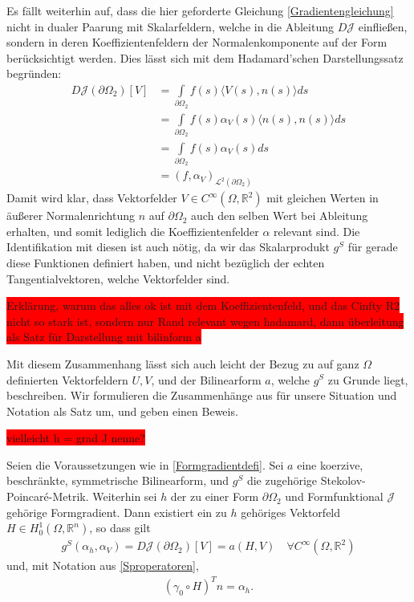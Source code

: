 Es fällt weiterhin auf, dass die hier geforderte Gleichung \ref{Gradientengleichung} nicht in dualer Paarung mit Skalarfeldern, welche in die Ableitung $D\mathcal{J}$ einfließen, sondern in deren Koeffizientenfeldern der Normalenkomponente auf der Form berücksichtigt werden. Dies lässt sich mit dem Hadamard'schen Darstellungssatz begründen:
\begin{align*}
	D\mathcal{J}(\partial\Omega_2)[V] &= \underset{\partial\Omega_2}{\int}f(s)\langle V(s),n(s)\rangle ds \\
	&=\underset{\partial\Omega_2}{\int}f(s) \alpha_V(s)\langle n(s),n(s)\rangle ds \\
	&=\underset{\partial\Omega_2}{\int}f(s) \alpha_V(s) ds \\
	&= (f,\alpha_V)_{\mathcal{L}^2(\partial\Omega_2)}
\end{align*}
Damit wird klar, dass Vektorfelder $V\in C^\infty(\Omega,\mathbb{R}^2)$ mit gleichen Werten in äußerer Normalenrichtung $n$ auf $\partial\Omega_2$ auch den selben Wert bei Ableitung erhalten, und somit lediglich die Koeffizientenfelder $\alpha$ relevant sind. Die Identifikation mit diesen ist auch nötig, da wir das Skalarprodukt $g^S$ für gerade diese Funktionen definiert haben, und nicht bezüglich der echten Tangentialvektoren, welche Vektorfelder sind.

\colorbox{red}{Erklärung, warum das alles ok ist mit dem Koeffizientenfeld, und das Cinfty R2 nicht so stark ist, sondern nur Rand relevant wegen hadamard, dann überleitung als Satz für Darstellung mit bilinform a }

Mit diesem Zusammenhang lässt sich auch leicht der Bezug zu auf ganz $\Omega$ definierten Vektorfeldern $U,V$, und der Bilinearform $a$, welche $g^S$ zu Grunde liegt, beschreiben. Wir formulieren die Zusammenhänge aus \cite{bfgs1} für unsere Situation und Notation als Satz um, und geben einen Beweis. 

\colorbox{red}{vielleicht h = grad J nenne?}

\begin{theorem}
Seien die Voraussetzungen wie in \ref{Formgradientdefi}. Sei $a$ eine koerzive, beschränkte, symmetrische Bilinearform, und $g^S$ die zugehörige Stekolov-Poincaré-Metrik. Weiterhin sei $h$ der zu einer Form $\partial\Omega_2$ und Formfunktional $\mathcal{J}$ gehörige Formgradient. Dann existiert ein zu $h$ gehöriges Vektorfeld $H \in H^1_0(\Omega, \mathbb{R}^n)$, so dass gilt
\begin{align}\label{zentraleDeformation}
	g^S(\alpha_h, \alpha_V) = D\mathcal{J}(\partial\Omega_2)[V] = a(H,V) \quad \forall C^\infty(\Omega,\mathbb{R}^2)
\end{align}
und, mit Notation aus \ref{Sproperatoren},
\begin{align*}
	(\gamma_0\circ H)^T n = \alpha_h.
\end{align*}
\end{theorem}

